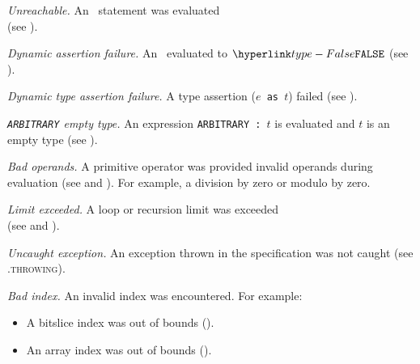 \begin{description}

\hypertarget{def-unreachableerror}{}
\item[$\UnreachableError$]
  \textit{Unreachable.}
  An \unreachablestatementterm\ statement was evaluated\\
    (see ).

\hypertarget{def-dynamicassertionfailure}{}
\item[$\DynamicAssertionFailure$]
  \textit{Dynamic assertion failure.}
  An \assertionstatementterm\ evaluated to $\False$
    (see ).

\hypertarget{def-dynamictypeassertionfailure}{}
\item[$\DynamicTypeAssertionFailure$]
  \textit{Dynamic type assertion failure.}
  A type assertion (\texttt{$e$ as $t$}) failed
    (see ).

\hypertarget{def-arbitraryemptytype}{}
\item[$\ArbitraryEmptyType$]
  \textit{\texttt{ARBITRARY} empty type.}
  An expression \texttt{ARBITRARY : $t$} is evaluated and $t$ is an empty type (see ).

\hypertarget{def-dynamicbadoperands}{}
\item[$\DynamicBadOperands$]
  \textit{Bad operands.}
  A primitive operator was provided invalid operands during evaluation (see  and ).
  For example, a division by zero or modulo by zero.

\hypertarget{def-limitexceeded}{}
\item[$\LimitExceeded$]
  \textit{Limit exceeded.}
  A loop or recursion limit was exceeded \\
  (see  and ).

\hypertarget{def-uncaughtexception}{}
\item[$\UncaughtException$]
  \textit{Uncaught exception.}
  An exception thrown in the specification was not caught (see .\textsc{throwing}).

\hypertarget{def-badindex}{}
\item[$\BadIndex$]
  \textit{Bad index.}
  An invalid index was encountered.
  For example:
  \begin{itemize}
    \item A bitslice index was out of bounds ().
    \item An array index was out of bounds ().
  \end{itemize}


\end{description}
